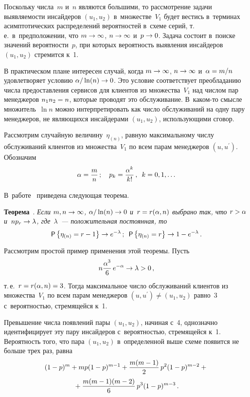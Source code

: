 \begin{multicols}{2}
  Поскольку числа~$m$ и~$n$ являются большими, то рассмотрение задачи 
выявляемости инсайдеров $(u_1, u_2)$ в~множестве~$V_1$ будет вестись 
в~терминах асимптотических распределений вероятностей в~схеме серий, т.\,е.\ 
в~предположении, что $m\hm\to \infty$, $n\hm\to \infty$ и~$p\hm\to 0$. Задача 
состоит в~поиске значений вероятности~$p$, при которых вероятность выявления 
инсайдеров $(u_1, u_2)$ стремится к~1. 
  
  В практическом плане интересен случай, когда $m\hm\to \infty$, $n\hm\to \infty$ 
и~$\alpha\hm= m/n$ удовлетворяет условию $\alpha/\ln(n) \hm\to 0$. Это условие 
соответствует преобладанию числа предоставления сервисов для клиентов из 
множества~$V_1$ над числом пар менеджеров $n_1 n_2\hm=n$, которые 
проводят это обслуживание. В~каком-то смысле множитель~$\ln n$ можно 
интерпретировать как число обслуживаний на одну пару менеджеров, не 
являющихся инсайдерами $(u_1, u_2)$, использующими сговор. 
  
  Рассмотрим случайную величину~$\eta_{(n)}$, равную максимальному числу 
обслуживаний клиентов из множества~$V_1$  по всем парам менеджеров $(u, 
u^\prime)$. Обозначим 
  $$
  \alpha=\displaystyle\frac{\displaystyle m\mathstrut}{\displaystyle n\mathstrut}\,;\quad p_k=\displaystyle\frac{\displaystyle \alpha^k\mathstrut}{\displaystyle k!\mathstrut}\,,\enskip k=0,1,\ldots
  $$
  
  В~работе~\cite{7-gr} приведена следующая теорема.
  
  \smallskip
  
  \noindent
  \textbf{Теорема}~\cite{7-gr}. \textit{Если $m, n \hm\to \infty$, $\alpha/ \ln(n)\hm\to 0$ и~$r\hm= 
r(\alpha, n)$ выбрано так, что $r\hm> \alpha$ и~$np_r\hm\to \lambda$, где~$\lambda$~--- 
положительная постоянная, то} 
  $$
  {\sf P}\left\{ \eta_{(n)} = r-1\right\}\to e^{-\lambda}\,;\enskip 
  {\sf P}\left\{ \eta_{(n)}=r\right\} \to 1 -  
e^{-\lambda}\,.
  $$
  
  Рассмотрим простой пример применения этой теоремы. Пусть
  $$
  n\displaystyle\frac{\displaystyle \alpha^3\mathstrut}{\displaystyle 6\mathstrut}\,e^{-\alpha} \to \lambda >0\,,
  $$
т.\,е.\ $r\hm= r(\alpha, n)\hm=3$. Тогда максимальное число обслуживаний 
клиентов из множества~$V_1$  по всем парам менеджеров $(u, u^\prime)\not= 
(u_1, u_2)$ равно~3 с~вероятностью, стремящейся к~1. 

  Превышение числа появлений пары $(u_1, u_2)$, начиная с~4, однозначно 
идентифицирует эту пару инсайдеров с~вероятностью, стремящейся к~1. 
Вероятность того, что пара $(u_1, u_2)$ в~определенной выше схеме появится не 
больше трех раз, равна
  \begin{multline*}
  (1-p)^m+mp(1-p)^{m-1}+\displaystyle\frac{\displaystyle m(m-1)\mathstrut}{\displaystyle 2\mathstrut}\,p^2 (1-p)^{m-2}+{}\\
  {}+ \displaystyle\frac{\displaystyle m(m-1)(m-2)\mathstrut}{\displaystyle 6\mathstrut}\,p^3(1-p)^{m-3}\,.
  \end{multline*}
  

\end{multicols}
